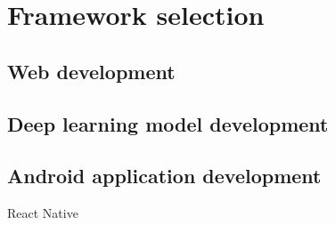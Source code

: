 \section{Framework selection}
\label{sec:Framework selection}
\subsection{Web development} %
\citet{nodejs2021}

\citet{react2021}

\citet{redux2021}

\subsection{Deep learning model development} %
\citet{abadi2015tensorflow}

\citet{steiner2019pytorch}

\citet{florencio2019performance}

\subsection{Android application development} %
\citet{singh2020mobile}


React Native \citet{eisenman2015learning}